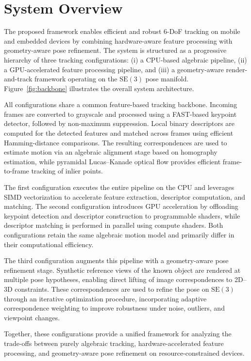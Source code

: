 \section{System Overview}

The proposed framework enables efficient and robust 6-DoF tracking on mobile and embedded devices by combining hardware-aware feature processing with geometry-aware pose refinement. The system is structured as a progressive hierarchy of three tracking configurations: (i) a CPU-based algebraic pipeline, (ii) a GPU-accelerated feature processing pipeline, and (iii) a geometry-aware render-and-track framework operating on the $\mathrm{SE}(3)$ pose manifold. Figure~\ref{fig:backbone} illustrates the overall system architecture.



All configurations share a common feature-based tracking backbone. Incoming frames are converted to grayscale and processed using a FAST-based keypoint detector, followed by non-maximum suppression. Local binary descriptors are computed for the detected features and matched across frames using efficient Hamming-distance comparisons. The resulting correspondences are used to estimate motion via an algebraic alignment stage based on homography estimation, while pyramidal Lucas--Kanade optical flow provides efficient frame-to-frame tracking of inlier points.

The first configuration executes the entire pipeline on the CPU and leverages SIMD vectorization to accelerate feature extraction, descriptor computation, and matching. The second configuration introduces GPU acceleration by offloading keypoint detection and descriptor construction to programmable shaders, while descriptor matching is performed in parallel using compute shaders. Both configurations retain the same algebraic motion model and primarily differ in their computational efficiency.

The third configuration augments this pipeline with a geometry-aware pose refinement stage. Synthetic reference views of the known object are rendered at multiple pose hypotheses, enabling direct lifting of image correspondences to 2D--3D constraints. These correspondences are used to refine the pose on $\mathrm{SE}(3)$ through an iterative optimization procedure, incorporating adaptive correspondence weighting to improve robustness under noise, outliers, and viewpoint changes.

Together, these configurations provide a unified framework for analyzing the trade-offs between purely algebraic tracking, hardware-accelerated feature processing, and geometry-aware pose refinement on resource-constrained devices.